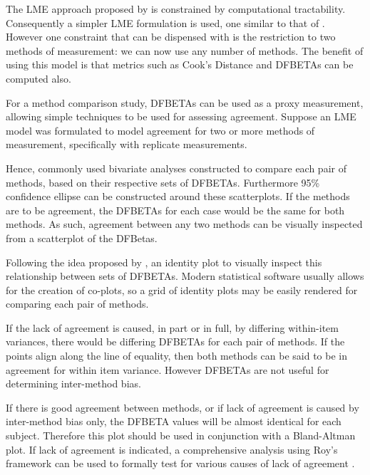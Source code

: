 \documentclass[12pt, a4paper]{report}
\theoremstyle{plain}
\theoremstyle{definition}
\theoremstyle{remark}
\begin{document}
The LME approach proposed by \citet{ARoy2009} is constrained by computational tractability. Consequently a simpler LME formulation is used, one similar to that of \citet{BXC2008}. However one constraint that can be dispensed with is the restriction to two methods of measurement: we can now use any number of methods. The benefit of using this model is that metrics such as Cook's Distance and DFBETAs can be computed also.
	
For a method comparison study, DFBETAs can be used as a proxy measurement, allowing simple techniques to be used for assessing agreement. Suppose an LME model was formulated to model agreement for two or more methods of measurement, specifically with replicate measurements.

Hence, commonly used bivariate analyses constructed to compare each pair of methods, based on their respective sets of DFBETAs. Furthermore 95\% confidence ellipse can be constructed around these scatterplots. If the methods are to be agreement, the DFBETAs for each case would be the same for both methods. As such, agreement between any two methods can be visually inspected from a scatterplot of the DFBetas. 
	


Following the idea proposed by \citet{BA86}, an identity plot to visually inspect this relationship between sets of DFBETAs. Modern statistical software usually allows for the creation of co-plots, so a grid of identity plots may be easily rendered for comparing each pair of methods.

If the lack of agreement is caused, in part or in full, by differing within-item variances, there would be differing DFBETAs for each pair of methods. If the points align along the line of equality, then both methods can be said to be in agreement for within item variance. However DFBETAs are not useful for determining inter-method bias. 

If there is good agreement between methods, or if lack of agreement is caused by inter-method bias only, the DFBETA values will be almost identical for each subject. Therefore this plot should be used in conjunction with a Bland-Altman plot. If lack of agreement is indicated, a comprehensive analysis using Roy's framework can be used to formally test for various causes of lack of agreement \citep{ARoy2009}.
	
\end{document}
